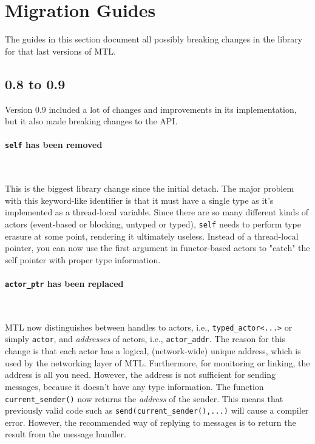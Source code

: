 \section{Migration Guides}

The guides in this section document all possibly breaking changes in the
library for that last versions of MTL.

\subsection{0.8 to 0.9}

Version 0.9 included a lot of changes and improvements in its implementation,
but it also made breaking changes to the API.

\paragraph{\lstinline^self^ has been removed}

~

This is the biggest library change since the initial detach. The major problem
with this keyword-like identifier is that it must have a single type as it's
implemented as a thread-local variable. Since there are so many different kinds
of actors (event-based or blocking, untyped or typed), \lstinline^self^ needs
to perform type erasure at some point, rendering it ultimately useless. Instead
of a thread-local pointer, you can now use the first argument in functor-based
actors to "catch" the self pointer with proper type information.

\paragraph{\lstinline^actor_ptr^ has been replaced}

~

MTL now distinguishes between handles to actors, i.e.,
\lstinline^typed_actor<...>^ or simply \lstinline^actor^, and \emph{addresses}
of actors, i.e., \lstinline^actor_addr^. The reason for this change is that
each actor has a logical, (network-wide) unique address, which is used by the
networking layer of MTL. Furthermore, for monitoring or linking, the address
is all you need. However, the address is not sufficient for sending messages,
because it doesn't have any type information. The function
\lstinline^current_sender()^ now returns the \emph{address} of the sender. This
means that previously valid code such as \lstinline^send(current_sender(),...)^
will cause a compiler error. However, the recommended way of replying to
messages is to return the result from the message handler.

